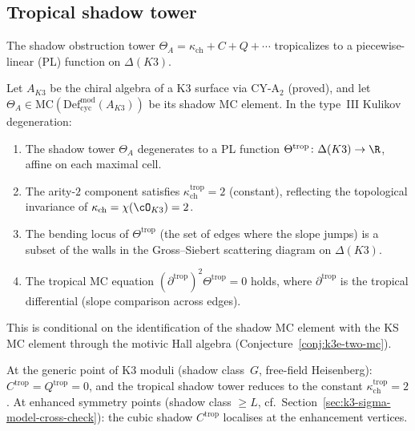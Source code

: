 \subsection{Tropical shadow tower}
\label{subsec:tropical-shadow}

The shadow obstruction tower $\Theta_A = \kappa_{\mathrm{ch}} + C + Q + \cdots$ tropicalizes to a piecewise-linear (PL) function on $\Delta(K3)$.

\begin{conjecture}
\label{conj:tropical-shadow}
\ClaimStatusConjectured
Let $A_{K3}$ be the chiral algebra of a K3 surface via CY-A$_2$ \textup{(}proved\textup{)}, and let $\Theta_A \in \mathrm{MC}(\mathrm{Def}_{\mathrm{cyc}}^{\mathrm{mod}}(A_{K3}))$ be its shadow MC element.  In the type~III Kulikov degeneration:
\begin{enumerate}[label=\textup{(\roman*)}]
\item The shadow tower $\Theta_A$ degenerates to a PL function $\Theta^{\mathrm{trop}} \colon \Delta(K3) \to \R$, affine on each maximal cell.
\item The arity-$2$ component satisfies $\kappa_{\mathrm{ch}}^{\mathrm{trop}} = 2$ \textup{(}constant\textup{)}, reflecting the topological invariance of $\kappa_{\mathrm{ch}} = \chi(\cO_{K3}) = 2$.
\item The bending locus of $\Theta^{\mathrm{trop}}$ \textup{(}the set of edges where the slope jumps\textup{)} is a subset of the walls in the Gross--Siebert scattering diagram on $\Delta(K3)$.
\item The tropical MC equation $(\partial^{\mathrm{trop}})^2 \Theta^{\mathrm{trop}} = 0$ holds, where $\partial^{\mathrm{trop}}$ is the tropical differential \textup{(}slope comparison across edges\textup{)}.
\end{enumerate}
This is conditional on the identification of the shadow MC element with the KS MC element through the motivic Hall algebra \textup{(}Conjecture~\textup{\ref{conj:k3e-two-mc})}.
\end{conjecture}

At the generic point of K3 moduli \textup{(}shadow class~$G$, free-field Heisenberg\textup{)}: $C^{\mathrm{trop}} = Q^{\mathrm{trop}} = 0$, and the tropical shadow tower reduces to the constant $\kappa_{\mathrm{ch}}^{\mathrm{trop}} = 2$.  At enhanced symmetry points \textup{(}shadow class $\geq L$, cf.\ Section~\ref{sec:k3-sigma-model-cross-check}\textup{)}: the cubic shadow $C^{\mathrm{trop}}$ localises at the enhancement vertices.

